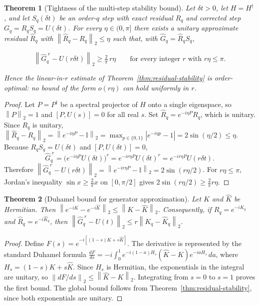 \documentclass[aps,prresearch,reprint,superscriptaddress,nofootinbib,amsmath,amssymb]{revtex4-2}
\newcommand{\norm}[1]{\left\lVert #1 \right\rVert}
\newcommand{\abs}[1]{\left\lvert #1 \right\rvert}
\newcommand{\id}{\mathbb{I}}
\newcommand{\dt}{\delta t}
\newtheorem{theorem}{Theorem}
\begin{document}
\begin{theorem}[Tightness of the multi-step stability bound]
\label{thm:stability-tight}
Let $\dt>0$, let $H=H^\dagger$, and let $S_q(\dt)$ be an order-$q$ step with exact residual $R_q$ and corrected step $G_q=R_qS_q=U(\dt)$. For every $\eta\in(0,\pi]$ there exists a \emph{unitary} approximate residual $\widehat R_q$ with $\norm{\widehat R_q-R_q}_2\leq\eta$ such that, with $\widehat G_q=\widehat R_qS_q$,
\begin{widetext}
\begin{equation}
    \norm{\widehat G_q^{\;r}-U(r\dt)}_2\geq\tfrac{2}{\pi}\,r\eta
    \qquad\text{for every integer } r \text{ with } r\eta\leq\pi.
    \label{eq:stability-tight}
\end{equation}
\end{widetext}
Hence the linear-in-$r$ estimate of Theorem~\ref{thm:residual-stability} is order-optimal: no bound of the form $o(r\eta)$ can hold uniformly in $r$.
\end{theorem}

\begin{proof}
Let $P=P^\dagger$ be a spectral projector of $H$ onto a single eigenspace, so $\norm{P}_2=1$ and $[P,U(s)]=0$ for all real $s$. Set $\widehat R_q=e^{-i\eta P}R_q$, which is unitary. Since $R_q$ is unitary, $\norm{\widehat R_q-R_q}_2=\norm{e^{-i\eta P}-\id}_2=\max_{p\in\{0,1\}}\abs{e^{-i\eta p}-1}=2\sin(\eta/2)\leq\eta$. Because $R_qS_q=U(\dt)$ and $[P,U(\dt)]=0$,
\begin{equation*}
    \widehat G_q^{\;r}=\bigl(e^{-i\eta P}U(\dt)\bigr)^r=e^{-ir\eta P}U(\dt)^r=e^{-ir\eta P}U(r\dt).
\end{equation*}
Therefore $\norm{\widehat G_q^{\;r}-U(r\dt)}_2=\norm{e^{-ir\eta P}-\id}_2=2\sin(r\eta/2)$. For $r\eta\leq\pi$, Jordan's inequality $\sin x\geq\frac{2}{\pi}x$ on $[0,\pi/2]$ gives $2\sin(r\eta/2)\geq\frac{2}{\pi}r\eta$.
\end{proof}

\begin{theorem}[Duhamel bound for generator approximation]
\label{thm:duhamel}
Let $K$ and $\widehat K$ be Hermitian. Then $\norm{e^{-iK}-e^{-i\widehat K}}_2\leq \norm{K-\widehat K}_2$. Consequently, if $R_q=e^{-iK_q}$ and $\widehat R_q=e^{-i\widehat K_q}$, then $\norm{\widehat G_q^{\;r}-U(t)}_2\leq r\norm{K_q-\widehat K_q}_2$.
\end{theorem}

\begin{proof}
Define $F(s)=e^{-i[(1-s)K+s\widehat K]}$. The derivative is represented by the standard Duhamel formula $\frac{dF}{ds}=-i\int_0^1 e^{-i(1-a)H_s}(\widehat K-K)e^{-iaH_s}\,da$, where $H_s=(1-s)K+s\widehat K$. Since $H_s$ is Hermitian, the exponentials in the integral are unitary, so $\norm{dF/ds}_2\leq\norm{\widehat K-K}_2$. Integrating from $s=0$ to $s=1$ proves the first bound. The global bound follows from Theorem~\ref{thm:residual-stability}, since both exponentials are unitary.
\end{proof}
\end{document}
